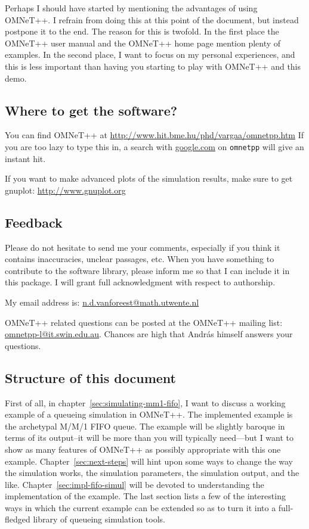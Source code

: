 \documentclass[a4paper]{article}
\begin{document}
Perhaps I should have started by mentioning the advantages of using
OMNeT++. I refrain from doing this at this point of the document,
but instead postpone it to the end. The reason for this is
twofold. In the first place the OMNeT++ user manual and the OMNeT++
home page mention plenty of examples. In the second place, I want to
focus on my personal experiences, and this is less important than
having you starting to play with OMNeT++ and this demo.

\subsection{Where to get the software?}
\label{sec:where-get-software}
You can find OMNeT++ at
\url{http://www.hit.bme.hu/phd/vargaa/omnetpp.htm} If you are too lazy
to type this in, a search with \url{google.com} on \texttt{omnetpp}
will give an instant hit.

\noindent
If you want to make advanced plots of the simulation results, make
sure to get gnuplot:
\url{http://www.gnuplot.org}

\subsection{Feedback}
\label{sec:feedback}
Please do not hesitate to send me your comments, especially if you
think it contains inaccuracies, unclear passages, etc. When you have
something to contribute to the software library, please inform me so
that I can include it in this package. I will grant full
acknowledgment with respect to authorship.

My email address is: \url{n.d.vanforeest@math.utwente.nl}

OMNeT++ related questions can be posted at the OMNeT++ mailing list:
\url{omnetpp-l@it.swin.edu.au}. Chances are high that Andr{\'a}s himself
answers your questions.


\subsection{Structure of this document}
\label{sec:struct-this-docum}
First of all, in chapter~\ref{sec:simulating-mm1-fifo}, I want to
discuss a working example of a queueing simulation in OMNeT++.  The
implemented example is the archetypal M/M/1 FIFO queue. The example
will be slightly baroque in terms of its output--it will be more than
you will typically need---but I want to show as many features of
OMNeT++ as possibly appropriate with this one example.
Chapter~\ref{sec:next-steps} will hint upon some ways to change the
way the simulation works, the simulation parameters, the simulation
output, and the like.  Chapter~\ref{sec:impl-fifo-simul} will be
devoted to understanding the implementation of the example.  The last
section lists a few of the interesting ways in which the current
example can be extended so as to turn it into a full-fledged library
of queueing simulation tools.
\end{document}
